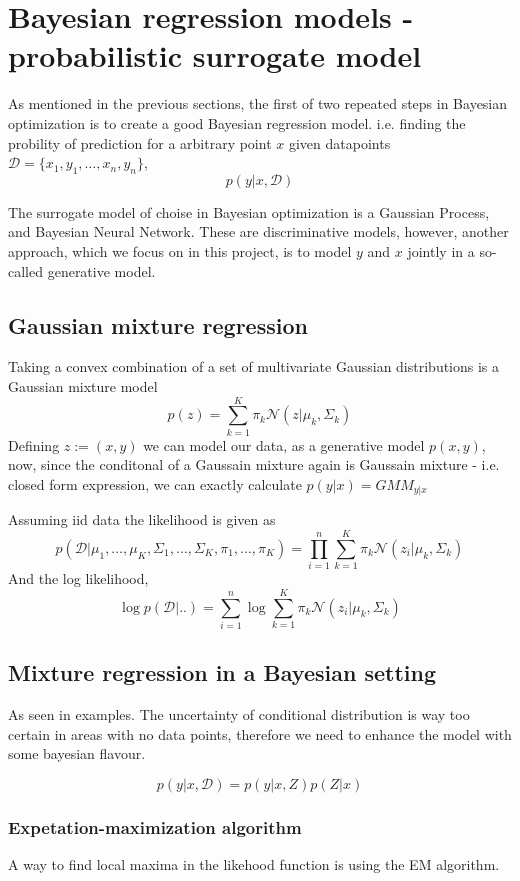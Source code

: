 \section{Bayesian regression models - probabilistic surrogate model}
As mentioned in the previous sections, the first of two repeated steps in Bayesian optimization
is to create a good Bayesian regression model. %
i.e. finding the probility of prediction for a arbitrary point $x$ given datapoints 
$\mathcal{D} = \{x_1, y_1, \dots, x_n, y_n\}$, 
 $$p(y|x,\mathcal{D})$$

The surrogate model of choise in Bayesian optimization is a Gaussian Process, and Bayesian Neural Network.
These are discriminative models, however, another approach, which we focus on in this project, is
to model $y$ and $x$ jointly in a so-called generative model.

\subsection{Gaussian mixture regression}
Taking a convex combination of a set of multivariate Gaussian distributions is a Gaussian mixture model
$$p(z) = \sum_{k=1}^K \pi_k \mathcal{N}(z|\mu_k, \Sigma_k)$$  
Defining $z := (x,y)$ we can model our data, as a generative model $p(x,y)$, now, since the conditonal 
of a Gaussain mixture again is Gaussain mixture - i.e. closed form expression, we can exactly calculate
$p(y|x) = GMM_{y|x}$

Assuming iid data the likelihood is given as 
$$p(\mathcal{D}|\mu_1, \dots, \mu_K, \Sigma_1, \dots, \Sigma_K, \pi_1, \dots, \pi_K) = \prod_{i=1}^n \sum_{k=1}^K \pi_k \mathcal{N}(z_i|\mu_k, \Sigma_k)$$
And the log likelihood, 
$$\log p(\mathcal{D}| ..) = \sum_{i=1}^n \log \sum_{k=1}^K \pi_k \mathcal{N}(z_i|\mu_k, \Sigma_k)$$


\subsection{Mixture regression in a Bayesian setting}
As seen in examples. The uncertainty of conditional distribution is way too certain
in areas with no data points, therefore we need to enhance the model with some bayesian 
flavour. 

$$p(y|x,\mathcal{D}) = p(y|x,Z)p(Z|x)$$



\subsubsection*{Expetation-maximization algorithm}
A way to find local maxima in the likehood function is using the EM algorithm. 

